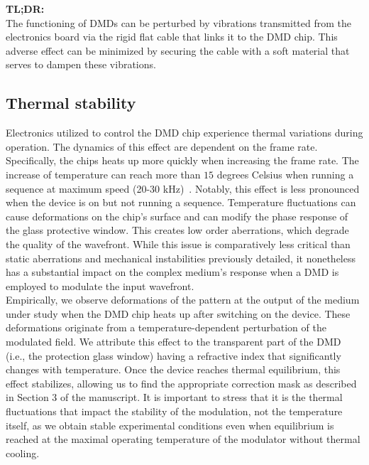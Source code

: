 \documentclass[12pt]{iopart}
\newcommand{\red}[1]{#1}
\begin{document}
\begin{tldr}
  \textbf{TL;DR:}\\
  The functioning of DMDs can be perturbed by vibrations transmitted from the electronics board
  via the rigid flat cable that links it to the DMD chip.
  This adverse effect can be minimized by securing the cable with a soft material
  that serves to dampen these vibrations.
\end{tldr}

\subsection{Thermal stability}

Electronics utilized to control the DMD chip experience thermal variations during operation.
The dynamics of this effect are dependent on the frame rate.
Specifically, the chips heats up more quickly when increasing the frame rate.
The increase of temperature can reach more than $15$ degrees Celsius
when running a sequence at maximum speed (20-30 kHz)~\cite{Rudolf2021thermal}.
Notably, this effect is less pronounced when the device is on but not running a sequence.
Temperature fluctuations can cause deformations on the chip's surface
and can modify the phase response of the glass protective window.
This creates low order aberrations, which degrade the quality of the wavefront.
While this issue is comparatively less critical than static aberrations and mechanical instabilities
previously detailed,
it nonetheless has a substantial impact on the complex medium's response
when a DMD is employed to modulate the input wavefront.\\

\red{Empirically, we observe deformations of the pattern 
at the output of the medium under study when the DMD chip heats up after switching on the device. 
These deformations originate from a temperature-dependent perturbation of the modulated field. 
We attribute this effect to the transparent part of the DMD 
(i.e., the protection glass window) 
having a refractive index that significantly changes with temperature. 
Once the device reaches thermal equilibrium, this effect stabilizes, 
allowing us to find the appropriate correction mask as described in Section 3 of the manuscript. 
It is important to stress that it is the thermal fluctuations that impact the stability of the modulation, 
not the temperature itself, 
as we obtain stable experimental conditions even when equilibrium is reached 
at the maximal operating temperature of the modulator without thermal cooling.\\}
\end{document}

